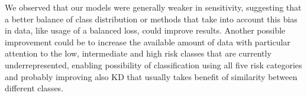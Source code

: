 We observed that our models were generally weaker in sensitivity, suggesting that a better balance of class distribution or methods that take into account this bias in data, like usage of a balanced loss, could improve results.
Another possible improvement could be to increase the available amount of data with particular attention to the low, intermediate and high risk classes that are currently underrepresented, enabling possibility of classification using all five risk categories and probably improving also KD that usually takes benefit of similarity between different classes.
